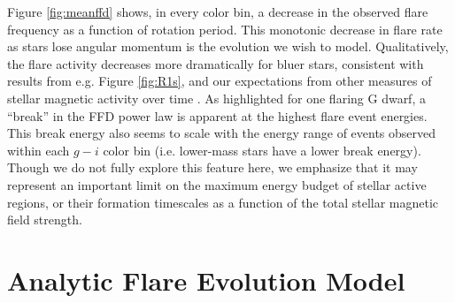 \documentclass[preprint2]{aastex62}
\begin{document}


Figure \ref{fig:meanffd} shows, in every color bin, a decrease in the observed flare frequency as a function of rotation period. This monotonic decrease in flare rate as stars lose angular momentum is the evolution we wish to model. Qualitatively, the flare activity decreases more dramatically for bluer stars, consistent with results from e.g. Figure \ref{fig:R1s}, and our expectations from other measures of stellar magnetic activity over time \citep[e.g.][]{shkolnik2014,nunez2017}. As \citet{davenport2016} highlighted for one flaring G dwarf, a ``break'' in the FFD power law is apparent at the highest flare event energies. This break energy also seems to scale with the energy range of events observed within each $g-i$ color bin (i.e. lower-mass stars have a lower break energy). Though we do not fully explore this feature here, we emphasize that it may represent an important limit on the maximum energy budget of stellar active regions, or their formation timescales as a function of the total stellar magnetic field strength.


\section{Analytic Flare Evolution Model}
\label{sec:ffdmodel}
\end{document}
